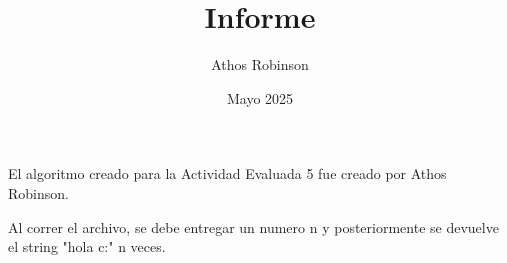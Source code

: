 \documentclass{article}
\title{Informe}
\author{Athos Robinson}
\date{Mayo 2025}
\begin{document}
\maketitle
El algoritmo creado para la Actividad Evaluada 5 fue creado por Athos Robinson.

Al correr el archivo, se debe entregar un numero n y posteriormente se devuelve el string "hola c:" n veces.
\end{document}
